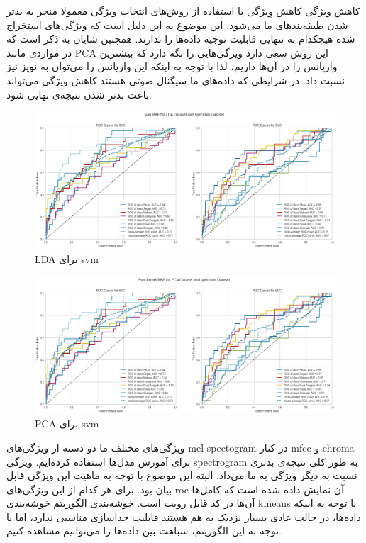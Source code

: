 \documentclass{article}
\begin{document}
کاهش ویژگی\newline
کاهش وِیژگی با استفاده از روش‌های انتخاب ویژگی معمولا منجر به بدتر شدن طبقه‌بندهای ما می‌شود. این موضوع به این دلیل است که ویژگی‌های استخراج شده هیچکدام به تنهایی قابلیت توجیه داده‌ها را ندارند. همچنین شایان به ذکر است که در مواردی مانند PCA این روش سعی دارد ویژگی‌هایی را نگه دارد که بیشترین واریانس را در آن‌ها داریم، لذا با توجه به اینکه این واریانس را می‌توان به نویز نیز نسبت داد. در شرایطی که داده‌های ما سیگنال صوتی هستند کاهش ویژگی می‌تواند باعث بدتر شدن نتیجه‌ی نهایی شود.\newline
\begin{figure}[h]
	\centering
	\includegraphics[width=0.7\linewidth]{Photo/LDAsvm}
	\caption[LDA برای svm]{LDA برای svm}
	\label{fig:ldasvm}
\end{figure}
\begin{figure}[h]
	\centering
	\includegraphics[width=0.7\linewidth]{Photo/PCAsvm}
	\caption[PCA برای svm]{PCA برای svm}
	\label{fig:pcasvm}
\end{figure}

ویژگی‌های مختلف\newline
ما دو دسته از ویژگی‌های mel-spectogram در کنار mfcc و chroma برای آموزش مدل‌ها استفاده کرده‌ایم. ویژگی spectrogram به طور کلی نتیجه‌ی بدتری نسبت به دیگر ویژگی به ما می‌داد. البته این موضوع با توجه به ماهیت این ویژگی قابل بیان بود. برای هر کدام از این ویژگی‌های roc آن نمایش داده شده است که کامل‌ها آن‌ها در کد قابل رویت است.\newline
خوشه‌بندی\newline
الگوریتم خوشه‌بندی kmeans با توجه به اینکه داده‌ها، در حالت عادی بسیار نزدیک به هم هستند قابلیت جداسازی مناسبی ندارد، اما با توجه به این الگوریتم، شباهت بین داده‌ها را می‌توانیم مشاهده کنیم.
\end{document}
